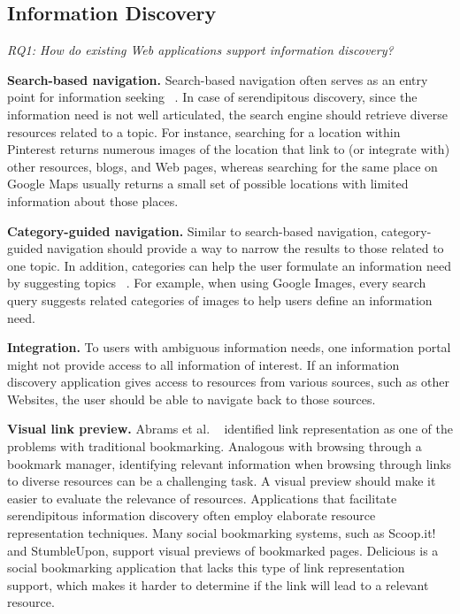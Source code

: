 {\subsection{Information Discovery}

\emph{RQ1: How do existing Web applications support information discovery?}







\textbf{Search-based navigation.} Search-based navigation often serves as an entry point for information seeking ~\cite{levene}. In case of serendipitous discovery, since the information need is not well articulated, the search engine should retrieve diverse resources related to a topic. For instance, searching for a location within Pinterest returns numerous images of the location that link to (or integrate with) other resources, blogs, and Web pages, whereas searching for the same place on Google Maps usually returns a small set of possible locations with limited information about those places.

\textbf{Category-guided navigation.} Similar to search-based navigation, category-guided navigation should provide a way to narrow the results to those related to one topic. In addition, categories can help the user formulate an information need by suggesting topics ~\cite{levene}. For example, when using Google Images, every search query suggests related categories of images to help users define an information need.

\textbf{Integration.} To users with ambiguous information needs, one information portal might not provide access to all information of interest. If an information discovery application gives access to resources from various sources, such as other Websites, the user should be able to navigate back to those sources.

\textbf{Visual link preview.} Abrams et al. ~\cite{abrams} identified link representation as one of the problems with traditional bookmarking. Analogous with browsing through a bookmark manager, identifying relevant information when browsing through links to diverse resources can be a challenging task. A visual preview should make it easier to evaluate the relevance of resources. Applications that facilitate serendipitous information discovery often employ elaborate resource representation techniques. Many social bookmarking systems, such as Scoop.it! and StumbleUpon, support visual previews of bookmarked pages. Delicious is a social bookmarking application that lacks this type of link representation support, which makes it harder to determine if the link will lead to a relevant resource.

}
